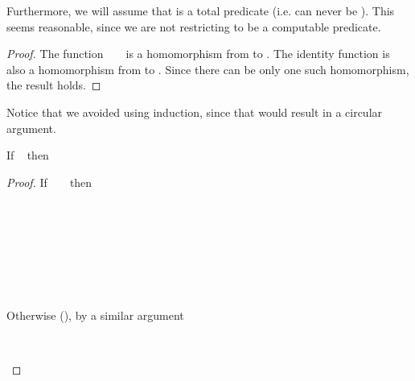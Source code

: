 \documentclass{seminar}
\newcommand{\NAT}{\textcolor{MathColor}{\ensuremath{\mathbb{N}}}}
\begin{document}
\begin{slide}
Furthermore, we will assume that  is a total predicate (i.e.
 can never be \bottom).  This seems reasonable, since we are
not restricting  to be a computable predicate.


\newpage


\begin{lemma} \label{lemma-a}
\end{lemma}
\begin{proof}
The function ~  ~ is a homomorphism from \tc{\NAT} to
\tc{\NAT}.  The identity function is also a homomorphism from \tc{\NAT} to
\tc{\NAT}.  Since there can be only one such homomorphism, the result holds.
\end{proof}

Notice that we avoided using induction, since that would result in a
circular argument.

\newpage


\begin{lemma} \label{lemma-b}
If ~ 
\newline
then ~ 
\end{lemma}
\begin{proof}
If ~  ~ then
\begin{codenott}
\\
\\
\\
\\
\\
\\
\end{codenott}

Otherwise (), by a similar argument

\begin{codenott}
\\
\end{codenott}


\end{proof}
\end{slide}
\end{document}
